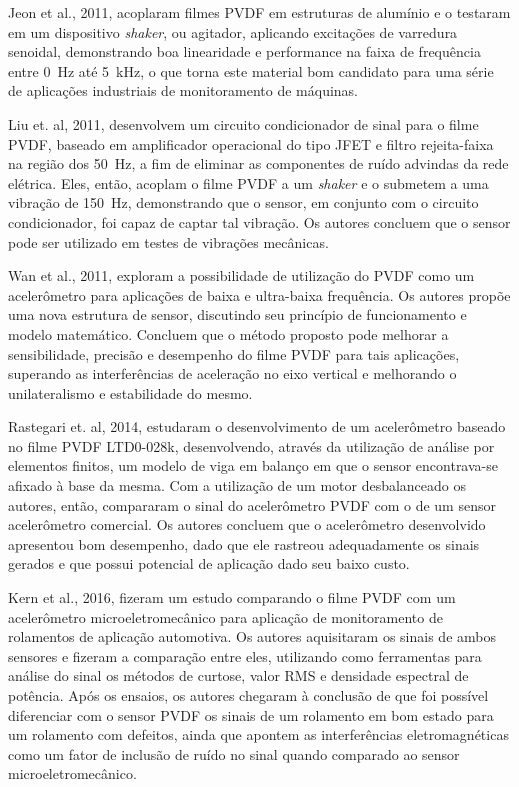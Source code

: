 \documentclass[
	12pt,				
	oneside,			
	a4paper,			
	english,			
	brazil,			
	]{abntex2ppgsi}
\begin{document}
Jeon et al., 2011, acoplaram filmes PVDF em estruturas de alumínio e o testaram em um dispositivo \textit{shaker}, ou agitador, aplicando excitações de varredura senoidal, demonstrando boa linearidade e performance na faixa de frequência entre \SI{0}{\hertz} até \SI{5}{\kilo\hertz}, o que torna este material bom candidato para uma série de aplicações industriais de monitoramento de máquinas.

Liu et. al, 2011, desenvolvem um circuito condicionador de sinal para o filme PVDF, baseado em amplificador operacional do tipo JFET e filtro rejeita-faixa na região dos \SI{50}{\hertz}, a fim de eliminar as componentes de ruído advindas da rede elétrica. Eles, então, acoplam o filme PVDF a um \textit{shaker} e o submetem a uma vibração de \SI{150}{\hertz}, demonstrando que o sensor, em conjunto com o circuito condicionador, foi capaz de captar tal vibração. Os autores concluem que o sensor pode ser utilizado em testes de vibrações mecânicas. 

Wan et al., 2011, exploram a possibilidade de utilização do PVDF como um acelerômetro para aplicações de baixa e ultra-baixa frequência. Os autores propõe uma nova estrutura de sensor, discutindo seu princípio de funcionamento e modelo matemático. Concluem que o método proposto pode melhorar a sensibilidade, precisão e desempenho do filme PVDF para tais aplicações, superando as interferências de aceleração no eixo vertical e melhorando o unilateralismo e estabilidade do mesmo.

Rastegari et. al, 2014, estudaram o desenvolvimento de um acelerômetro baseado no filme PVDF LTD0-028k, desenvolvendo, através da utilização de análise por elementos finitos, um modelo de viga em balanço em que o sensor encontrava-se afixado à base da mesma. Com a utilização de um motor desbalanceado os autores, então, compararam o sinal do acelerômetro PVDF com o de um sensor acelerômetro comercial. Os autores concluem que o acelerômetro desenvolvido apresentou bom desempenho, dado que ele rastreou adequadamente os sinais gerados e que possui potencial de aplicação dado seu baixo custo. 

Kern et al., 2016, fizeram um estudo comparando o filme PVDF com um acelerômetro microeletromecânico para aplicação de monitoramento de rolamentos de aplicação automotiva. Os autores aquisitaram os sinais de ambos sensores e fizeram a comparação entre eles, utilizando como ferramentas para análise do sinal os métodos de curtose, valor RMS e densidade espectral de potência. Após os ensaios, os autores chegaram à conclusão de que foi possível diferenciar com o sensor PVDF os sinais de um rolamento em bom estado para um rolamento com defeitos, ainda que apontem as interferências eletromagnéticas como um fator de inclusão de ruído no sinal quando comparado ao sensor microeletromecânico.
\end{document}
